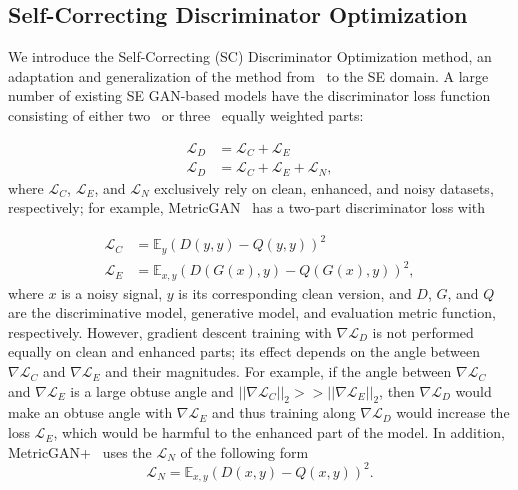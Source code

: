 \documentclass{article}
\def\L{{\cal L}}
\renewcommand{\L}{\mathcal{L}}
\newcommand{\norm}[1]{\left\lvert\left\lvert#1\right\rvert\right\rvert}
\begin{document}
\subsection{Self-Correcting Discriminator Optimization}\label{ss:scdo}

We introduce the Self-Correcting (SC) Discriminator Optimization method, an adaptation and generalization of the method from~\cite{Zadorozhnyy_2021_CVPR} to the SE domain. A large number of existing SE GAN-based models have the discriminator loss function consisting
of either two~\cite{pmlr-v97-fu19b, cao2022cmgan} or three~\cite{fu2021metricgan+} equally weighted parts: 

\begin{align}
    \L_D &= \L_C + \L_E \label{eq:2losses}\\
    \L_D &= \L_C + \L_E + \L_N,\label{eq:3losses}
\end{align}
where $\L_C$, $\L_E$, and $\L_N$ exclusively rely on clean, enhanced, and noisy datasets, respectively; for example, MetricGAN~\cite{pmlr-v97-fu19b} has a two-part discriminator loss with 

\begin{align}
    \L_C &= \mathbb{E}_y\left(D(y,y)-Q(y,y)\right)^2 \\
    \L_E &= \mathbb{E}_{x,y}\left(D(G(x),y) - Q(G(x),y)\right)^2,
\end{align}
where $x$ is a noisy signal, $y$ is its corresponding clean version, and $D$, $G$, and $Q$ are the discriminative model, generative model, and evaluation metric function, respectively. However, gradient descent training with  $\nabla \L_D$ is not performed equally on clean and enhanced parts; its effect depends on the angle between $\nabla \L_C$ and $\nabla \L_E$ and their magnitudes. For example, if the angle between $\nabla \L_C$ and $\nabla \L_E$ is a large obtuse angle and $\norm{\nabla \L_C}_2 >> \norm{\nabla \L_E}_2$, then $\nabla \L_D$ would make an obtuse angle with $\nabla \L_E$ and thus training along $\nabla \L_D$ would increase the loss $\L_E$, which would be harmful to the enhanced part of the model. In addition, MetricGAN+~\cite{fu2021metricgan+} uses the $\L_N$ of the following form
\begin{equation}
    \L_N = \mathbb{E}_{x,y}\left(D(x,y)-Q(x,y)\right)^2.
\end{equation}
\end{document}
